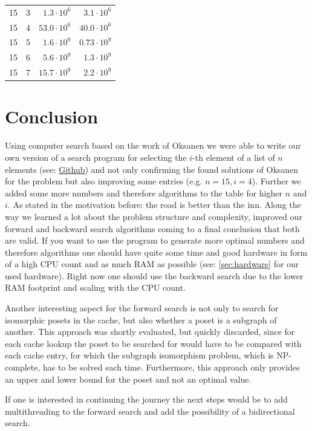\documentclass[10pt,journal,compsoc]{IEEEtran}
\begin{document}
\begin{table}[!t]
\begin{tabular}{c|c|r|r}
    15  & 3   & $1.3 \cdot 10^6$        & $3.1 \cdot 10^6$         \\
    15  & 4   & $53.0 \cdot 10^6$       & $40.0 \cdot 10^6$        \\
    15  & 5   & $1.6 \cdot 10^9$        & $0.73 \cdot 10^9$        \\
    15  & 6   & $5.6 \cdot 10^9$        & $1.3 \cdot 10^9$         \\
    15  & 7   & $15.7 \cdot 10^9$       & $2.2 \cdot 10^9$         \\
  \end{tabular}
\end{table}


\section{Conclusion}

Using computer search based on the work of Oksanen we were able to write our own
version of a search program for selecting the $i$-th element of a list of $n$
elements (see: \href{https://github.com/JGDoerrer/selection_generator}{Github})
and not only confirming the found solutions of Oksanen for the problem but also
improving some entries (e.g. $n = 15, i = 4$). Further we added some more
numbers and therefore algorithms to the table for higher $n$ and $i$. As stated
in the motivation before: the road is better than the inn. Along the way we
learned a lot about the problem structure and complexity, improved our forward
and backward search algorithms coming to a final conclusion that both are valid.
If you want to use the program to generate more optimal numbers and therefore
algorithms one should have quite some time and good hardware in form of a high
CPU count and as much RAM as possible (see: \ref{sec:hardware} for our used
hardware).
Right now one should use the backward search due to the lower RAM footprint and
scaling with the CPU count.

Another interesting aspect for the forward search is not only to search for
isomorphic posets in the cache, but also whether a poset is a subgraph of
another. This approach was shortly evaluated, but quickly discarded, since for
each cache lookup the poset to be searched for would have to be compared with
each cache entry, for which the subgraph isomorphism problem, which is
NP-complete, has to be solved each time. Furthermore, this approach only
provides an upper and lower bound for the poset and not an optimal value.

If one is interested in continuing the journey the next steps would be to add
multithreading to the forward search and add the possibility of a bidirectional
search.
\end{document}
